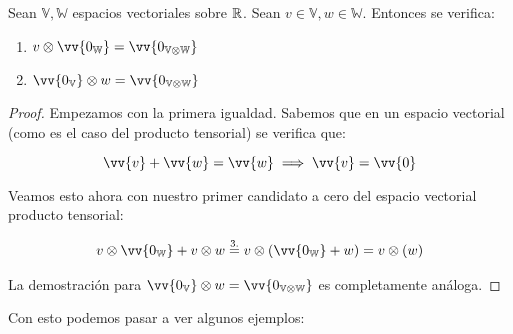 \begin{proposicion}
    Sean $\mathbb{V}, \mathbb{W}$ espacios vectoriales sobre $\mathbb{R}$. Sean $v \in \mathbb{V}, w \in \mathbb{W}$. Entonces se verifica:

    \begin{enumerate}
        \item $v \otimes \vv{0_\mathbb{W}} = \vv{0_{\mathbb{V} \otimes \mathbb{W}}}$
        \item $\vv{0_{\mathbb{V}}} \otimes w = \vv{0_{\mathbb{V} \otimes \mathbb{W}}}$
    \end{enumerate}
\end{proposicion}
\begin{proof}
    Empezamos con la primera igualdad. Sabemos que en un espacio vectorial (como es el caso del producto tensorial) se verifica que:

    \begin{equation} \label{eq:dem_tensor_cero}
        \vv{v} + \vv{w} = \vv{w} \then \vv{v} = \vv{0}
    \end{equation}

    Veamos esto ahora con nuestro primer candidato a cero del espacio vectorial producto tensorial:

    \begin{equation}
    \begin{split}
        v \otimes \vv{0_\mathbb{W}} + v \otimes w \eqtext{3.} v \otimes (\vv{0_\mathbb{W}} + w) = v \otimes (w)
    \end{split}
    \end{equation}

    La demostración para $\vv{0_{\mathbb{V}}} \otimes w = \vv{0_{\mathbb{V} \otimes \mathbb{W}}}$ es completamente análoga.


\end{proof}

Con esto podemos pasar a ver algunos ejemplos:

